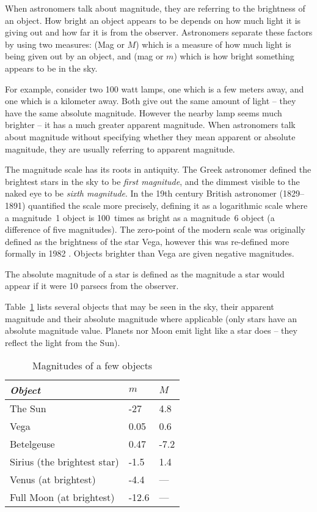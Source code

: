 When astronomers talk about magnitude, they are referring to the
brightness of an object. How bright an object appears to be depends on
how much light it is giving out and how far it is from the observer.
Astronomers separate these factors by using two measures:  (Mag or $M$) which is a measure of how much light is being
given out by an object, and  (mag or $m$) which
is how bright something appears to be in the sky.

For example, consider two 100 watt lamps, one which is a few meters
away, and one which is a kilometer away. Both give out the same amount
of light -- they have the same absolute magnitude. However the nearby
lamp seems much brighter -- it has a much greater apparent magnitude.
When astronomers talk about magnitude without specifying whether they
mean apparent or absolute magnitude, they are usually referring to
apparent magnitude.

The magnitude scale has its roots in antiquity. The Greek astronomer
 defined the brightest stars in the sky to be \emph{first
magnitude}, and the dimmest visible to the naked eye to be \emph{sixth
magnitude}. In the 19th century British astronomer  (1829--1891)
quantified the scale more precisely, defining it as a logarithmic scale
where a magnitude~1 object is 100~times as bright as a magnitude~6
object (a difference of five magnitudes). The zero-point of the modern
scale was originally defined as the brightness of the star Vega, however
this was re-defined more formally in 1982 \citep{landolt}. Objects brighter
than Vega are given negative magnitudes.

The absolute magnitude of a star is defined as the magnitude a star
would appear if it were 10 parsecs from the observer.

Table~\ref{tab:Concepts:Magnitudes} lists several objects that may be seen
in the sky, their apparent magnitude and their absolute magnitude where
applicable (only stars have an absolute magnitude value. Planets nor Moon emit light like a star does -- they reflect the light from the Sun).

\begin{table}[htb]
  \centering
  \begin{tabular}{lll}
\toprule
\emph{Object} & $m$ & $M$\\\midrule
The Sun & -27 & 4.8\\
Vega & 0.05 & 0.6\\
Betelgeuse & 0.47 & -7.2\\
Sirius (the brightest star) & -1.5 & 1.4\\
Venus (at brightest) & -4.4 & ---\\
Full Moon (at brightest) & -12.6 & ---\\
\bottomrule
\end{tabular}
  \caption{Magnitudes of a few objects}
  \label{tab:Concepts:Magnitudes}
\end{table}


